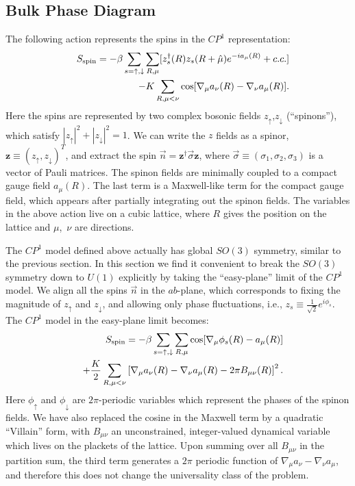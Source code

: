 \documentclass[prb,twocolumn]{revtex4-1}
\newcommand{\cp}{$CP^1$ }
\begin{document}
\subsection{Bulk Phase Diagram}
The following action represents the spins in the $CP^1$ representation:
\begin{eqnarray}
&&S_{\rm spin}=-\beta\sum_{s=\uparrow,\downarrow}\sum_{R,\mu} [z_s^\dagger(R)z_s(R+\hat\mu)e^{-ia_\mu(R)}+c.c.] \nonumber\\
&&-K\sum_{R,\mu<\nu} \cos[\nabla_\mu a_\nu(R)-\nabla_\nu a_\mu(R)].
\label{cp1action}
\end{eqnarray} 
Here the spins are represented by two complex bosonic fields $z_\uparrow$,$z_\downarrow$ (``spinons''), which satisfy $|z_\uparrow|^2+|z_\downarrow|^2=1$. We can write the $z$ fields as a spinor, $\mathbf{z}\equiv(z_\uparrow,z_\downarrow)^T$, and extract the spin $\vec{n}=\mathbf{z^\dagger} \vec\sigma \mathbf{z}$, where $\vec{\sigma}\equiv (\sigma_1,\sigma_2,\sigma_3)$ is a vector of Pauli matrices.
The spinon fields are minimally coupled to a compact gauge field $a_\mu(R)$. The last term is a Maxwell-like term for the compact gauge field, which appears after partially integrating out the spinon fields. The variables in the above action live on a cubic lattice, where $R$ gives the position on the lattice and $\mu$,~$\nu$ are directions.

The \cp model defined above actually has global $SO(3)$ symmetry, similar to the previous section. In this section we find it convenient to break the $SO(3)$ symmetry down to $U(1)$ explicitly by taking the ``easy-plane'' limit of the $CP^1$ model. We align all the spins $\vec{n}$ in the $ab$-plane, which corresponds to fixing the magnitude of $z_\uparrow$ and $z_\downarrow$, and allowing only phase fluctuations, i.e., $z_s\equiv \frac{1}{\sqrt{2}}e^{i\phi_s}$. The $CP^1$ model in the easy-plane limit becomes:
\begin{eqnarray}
&&S_{\rm spin}=-\beta\sum_{s=\uparrow,\downarrow}\sum_{R,\mu} \cos[\nabla_\mu\phi_s(R)-a_\mu(R)]\nonumber\\
&&+\frac{K}{2}\sum_{R,\mu<\nu}\left[\nabla_\mu a_\nu(R)-\nabla_\nu a_\mu(R)-2\pi B_{\mu\nu}(R)\right]^2.
\label{sspin}
\end{eqnarray}
Here $\phi_\uparrow$ and $\phi_\downarrow$ are $2\pi$-periodic variables which represent the phases of the spinon fields. We have also replaced the cosine in the Maxwell term by a quadratic ``Villain'' form, with $B_{\mu\nu}$ an unconstrained, integer-valued dynamical variable which lives on the plackets of the lattice. Upon summing over all $B_{\mu\nu}$ in the partition sum, the third term generates a $2\pi$ periodic function of $\nabla_\mu a_{\nu}-\nabla_\nu a_{\mu}$, and therefore this does not change the universality class of the problem.
\end{document}
